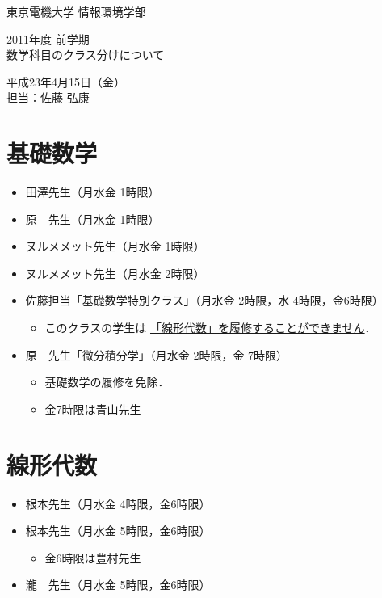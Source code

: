 \documentclass[a4j,landscape,25pt]{jsarticle}
\begin{document}
\thispagestyle{empty}
\vspace*{30pt}
\begin{center}
{\small 東京電機大学 情報環境学部}
\vspace{15pt}

{\large 2011年度 前学期\\数学科目のクラス分けについて}
\vspace{45pt}

{\footnotesize 
平成23年4月15日（金）\\
担当：佐藤 弘康
}
\end{center}

\section{基礎数学}

\begin{itemize}
 \item 田澤先生（月水金 1時限）
 \item 原　先生（月水金 1時限）
 \item ヌルメメット先生（月水金 1時限）
 \item ヌルメメット先生（月水金 2時限）
\end{itemize}

\begin{itemize}
 \item 佐藤担当「基礎数学特別クラス」（月水金 2時限，水 4時限，金6時限）
\begin{itemize}
 \item このクラスの学生は
\underline{「線形代数」を履修することができません}．
\end{itemize}
\end{itemize}

\begin{itemize}
 \item 原　先生「微分積分学」（月水金 2時限，金 7時限）
\begin{itemize}
 \item 基礎数学の履修を免除．
 \item 金7時限は青山先生
\end{itemize}
\end{itemize}

\section{線形代数}

\begin{itemize}
 \item 根本先生（月水金 4時限，金6時限）
 \item 根本先生（月水金 5時限，金6時限）
\begin{itemize}
 \item 金6時限は豊村先生
\end{itemize}
 \item 瀧　先生（月水金 5時限，金6時限）
\end{itemize}
\end{document}
